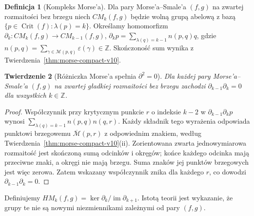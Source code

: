 \documentclass[11pt,a4paper,oneside]{report}
\newcommand{\Z}{\mathbb{Z}}
\theoremstyle{plain}
\newtheorem{twierdzenie}{Twierdzenie}[section]
\theoremstyle{definition}
\newtheorem{definicja}[twierdzenie]{Definicja}
\theoremstyle{remark}
\begin{document}
\begin{definicja}[Kompleks Morse'a]
\label{def:morse-complex-v10}
Dla pary Morse'a--Smale'a $(f,g)$ na zwartej rozmaitości bez brzegu
niech $CM_k(f,g)$ będzie wolną grupą abelową z bazą
$\{p\in\operatorname{Crit}(f):\lambda(p)=k\}$.
Określamy homomorfizm $\partial_k:CM_k(f,g)\to CM_{k-1}(f,g)$,
$\partial_kp=\sum_{\lambda(q)=k-1}n(p,q)q$, gdzie
$n(p,q)=\sum_{\gamma\in\mathcal M(p,q)}\varepsilon(\gamma)\in\Z$.
Skończoność sum wynika z Twierdzenia~\ref{thm:morse-compact-v10}.
\end{definicja}

\begin{twierdzenie}[Różniczka Morse'a spełnia $\partial^2=0$]
\label{thm:morse-d2-v10}
Dla każdej pary Morse'a--Smale'a $(f,g)$ na zwartej gładkiej
rozmaitości bez brzegu zachodzi $\partial_{k-1}\partial_k=0$
dla wszystkich $k\in\Z$.
\end{twierdzenie}
\begin{proof}
Współczynnik przy krytycznym punkcie $r$ o indeksie $k-2$
w $\partial_{k-1}\partial_kp$ wynosi
$\sum_{\lambda(q)=k-1}n(p,q)n(q,r)$.
Każdy składnik tego wyrażenia odpowiada punktowi brzegowemu
$\overline{\mathcal M}(p,r)$ z odpowiednim znakiem, według
Twierdzenia~\ref{thm:morse-compact-v10}(ii). Zorientowana
zwarta jednowymiarowa rozmaitość jest skończoną sumą odcinków
i okręgów; końce każdego odcinka mają przeciwne znaki,
a okręgi nie mają brzegu. Suma znaków jej punktów brzegowych
jest więc zerowa. Zatem wskazany współczynnik znika dla
każdego $r$, co dowodzi $\partial_{k-1}\partial_k=0$.
\end{proof}

Definiujemy $HM_k(f,g)=\ker\partial_k/\operatorname{im}\partial_{k+1}$.
Istotą teorii jest wykazanie, że grupy te nie są nowymi
niezmiennikami zależnymi od pary $(f,g)$.
\end{document}
